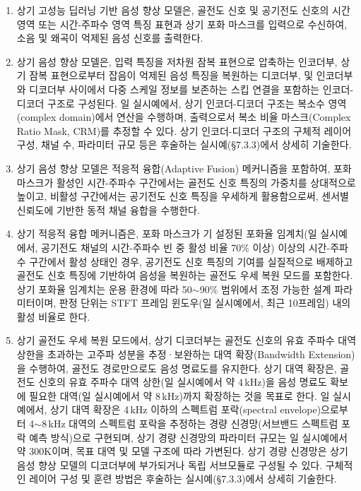 \documentclass{article}
\begin{document}
\begin{enumerate}[label = \textbf{(B.2.\arabic*)}]

    \item 상기 고성능 딥러닝 기반 음성 향상 모델은, 골전도 신호 및
    공기전도 신호의 시간 영역 또는 시간-주파수 영역 특징 표현과 상기
    포화 마스크를 입력으로 수신하여, 소음 및 왜곡이 억제된 음성 신호를
    출력한다.

    \item 상기 음성 향상 모델은, 입력 특징을 저차원 잠복 표현으로
    압축하는 인코더부, 상기 잠복 표현으로부터 잡음이 억제된 음성 특징을
    복원하는 디코더부, 및 인코더부와 디코더부 사이에서 다중 스케일
    정보를 보존하는 스킵 연결을 포함하는 인코더-디코더 구조로 구성된다. 일 실시예에서, 상기 인코더-디코더 구조는 복소수 영역(complex domain)에서 연산을 수행하며, 출력으로서 복소 비율 마스크(Complex Ratio Mask, CRM)를 추정할 수 있다. 상기 인코더-디코더 구조의 구체적 레이어 구성, 채널 수, 파라미터 규모 등은 후술하는 실시예(§7.3.3)에서 상세히 기술한다.

    \item 상기 음성 향상 모델은 적응적 융합(Adaptive Fusion) 메커니즘을
    포함하여, 포화 마스크가 활성인 시간-주파수 구간에서는 골전도 신호
    특징의 가중치를 상대적으로 높이고, 비활성 구간에서는 공기전도 신호
    특징을 우세하게 활용함으로써, 센서별 신뢰도에 기반한 동적 채널
    융합을 수행한다.

    \item 상기 적응적 융합 메커니즘은, 포화 마스크가 
    기 설정된 포화율 임계치(일 실시예에서, 공기전도 채널의 시간-주파수 빈 중 활성 비율 70\% 이상) 이상의 시간-주파수 구간에서 활성 상태인 
    경우, 공기전도 신호 특징의 기여를 실질적으로 
    배제하고 골전도 신호 특징에 기반하여 음성을 
    복원하는 골전도 우세 복원 모드를 포함한다. 상기 포화율 임계치는 운용 환경에 따라 50$\sim$90\% 범위에서 조정 가능한 설계 파라미터이며, 판정 단위는 STFT 프레임 윈도우(일 실시예에서, 최근 10프레임) 내의 활성 비율로 한다.

    \item 상기 골전도 우세 복원 모드에서, 상기 
    디코더부는 골전도 신호의 유효 주파수 대역 상한을 
    초과하는 고주파 성분을 추정·보완하는 
    대역 확장(Bandwidth Extension)을 수행하여, 골전도 
    경로만으로도 음성 명료도를 유지한다. 
    상기 대역 확장은, 골전도 신호의 유효 주파수 대역 상한(일 실시예에서 약 4\,kHz)을 음성 명료도 확보에 필요한 대역(일 실시예에서 약 8\,kHz)까지 확장하는 것을 목표로 한다. 일 실시예에서, 상기 대역 확장은 4\,kHz 이하의 스펙트럼 포락(spectral envelope)으로부터 4$\sim$8\,kHz 대역의 스펙트럼 포락을 추정하는 경량 신경망(서브밴드 스펙트럼 포락 예측 방식)으로 구현되며, 상기 경량 신경망의 파라미터 규모는 일 실시예에서 약 300K이며, 목표 대역 및 모델 구조에 따라 가변된다. 상기 경량 신경망은 상기 음성 향상 모델의 디코더부에 부가되거나 독립 서브모듈로 구성될 수 있다. 구체적인 레이어 구성 및 훈련 방법은 후술하는 실시예(§7.3.3)에서 상세히 기술한다.



\end{enumerate}
\end{document}
